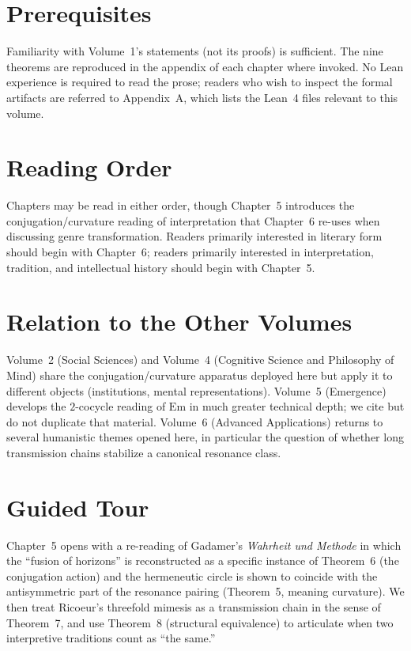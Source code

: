 \documentclass[11pt,oneside]{book}
\begin{document}
\section*{Prerequisites}
Familiarity with Volume~1's statements (not its proofs) is
sufficient. The nine theorems are reproduced in the appendix of
each chapter where invoked. No Lean experience is required to read
the prose; readers who wish to inspect the formal artifacts are
referred to Appendix~A, which lists the Lean~4 files relevant to
this volume.

\section*{Reading Order}
Chapters may be read in either order, though Chapter~5 introduces
the conjugation/curvature reading of interpretation that Chapter~6
re-uses when discussing genre transformation. Readers primarily
interested in literary form should begin with Chapter~6; readers
primarily interested in interpretation, tradition, and intellectual
history should begin with Chapter~5.

\section*{Relation to the Other Volumes}
Volume~2 (Social Sciences) and Volume~4 (Cognitive Science and
Philosophy of Mind) share the conjugation/curvature apparatus
deployed here but apply it to different objects (institutions,
mental representations). Volume~5 (Emergence) develops the
$2$-cocycle reading of $\mathrm{Em}$ in much greater technical
depth; we cite but do not duplicate that material. Volume~6
(Advanced Applications) returns to several humanistic themes
opened here, in particular the question of whether long
transmission chains stabilize a canonical resonance class.

\section*{Guided Tour}
Chapter~5 opens with a re-reading of Gadamer's \emph{Wahrheit und
Methode} in which the ``fusion of horizons'' is reconstructed as a
specific instance of Theorem~6 (the conjugation action) and the
hermeneutic circle is shown to coincide with the antisymmetric part
of the resonance pairing (Theorem~5, meaning curvature). We then
treat Ricoeur's threefold mimesis as a transmission chain in the
sense of Theorem~7, and use Theorem~8 (structural equivalence) to
articulate when two interpretive traditions count as ``the same.''
\end{document}
